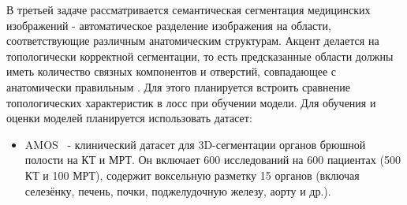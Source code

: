 В третьей задаче рассматривается семантическая сегментация медицинских изображений - автоматическое разделение изображения на области, соответствующие различным анатомическим структурам. Акцент делается на топологически корректной сегментации, то есть предсказанные области должны иметь количество связных компонентов и отверстий, совпадающее с анатомически правильным . Для этого планируется встроить сравнение топологических характеристик в лосс при обучении модели. Для обучения и оценки моделей планируется использовать датасет:

\begin{itemize}
\item AMOS~\cite{ji2022amos,amos2022zenodo} - клинический датасет для 3D-сегментации органов брюшной полости на КТ и МРТ. Он включает 600 исследований на 600 пациентах (500 КТ и 100 МРТ), содержит воксельную разметку 15 органов (включая селезёнку, печень, почки, поджелудочную железу, аорту и др.).
\end{itemize}
